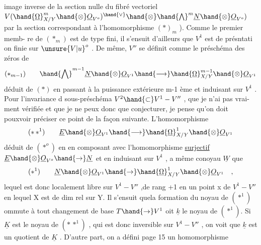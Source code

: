 
image inverse de la section nulle du fibré vectoriel $V(\hand{\underline{\Omega}}^m_{X/Y}\hand{\otimes}\underline{O}_{V^o})^{\hand{\vee}}\hand{\otimes}\hand{\bigwedge}^m\underline{N}\hand{\otimes}\underline{O}_{V^o})$
par la section correspondant à l'homomorphisme $(*)_{m}$ ). Comme le premier memb-%
re de $(*_m)$ est de type fini, il s'ensuit d'ailleurs que $V^1$ est de présntati%
on finie sur $\unsure{V|u}^o$ . De même, $V''$ se définit comme le préschéma des zéros de
\[ (*_{m-1}) \qquad \hand{\bigwedge}^{m-1}\underline{N}\hand{\otimes}\underline{O}_{V^1} \hand{\longrightarrow} \hand{\underline{\Omega}}^{m-1}_{X/Y}\hand{\otimes}\underline{O}_{V^1} \]
déduit de $(*)$ en passant à la puissance extérieure m-1 ème et induisant sur
$V^1$ . Pour l'invariance d sous-préschéma $V^2\hand{\subset} V^1-V''$ , que je n'ai pas vrai-%
ment vérifiée et que je ne peux donc que conjecturer, je pense qu'on doit
pouxvoir préciser ce point de la façon suivante. L'homomorphisme
\[ (*\,*^1) \qquad \underline{E}\hand{\otimes}\underline{O}_{V^1}\hand{\longrightarrow}\hand{\underline{\Omega}}^1_{X/Y}\hand{\otimes}\underline{O}_{V^1} \]
déduit de $(*^o)$ en  en composant avec l'homomorphisme
\uline{surjectif} $\underline{E}\hand{\otimes}\underline{O}_{V^o}\hand{\to}\underline{N}$ et en  induisant sur $V^1$ , a même conoyau
$\underline{W}$ que
\[ (*^1) \qquad \underline{N}\hand{\otimes}\underline{O}_{V^1}\hand{\to}\hand{\underline{\Omega}}^1_{X/Y}\hand{\otimes}\underline{O}_{V^1} \quad , \]
lequel  est donc localement libre sur $V^1-V''$ ,\hand{(}de rang +1 en un point
x de $V^1-V''$ en lequel X est de dim rel  sur Y\hand{)}. Il s'ensuit quela formation
du noyau de $(*^1)$ ommute à tout changement de base $T\hand{\to} V^1$ oit $\underline{k}$ le
noyau de $(*^1)$. Si $\underline{K}$ est le noyau de $(*\,*^1)$ , qui est donc inversible sur
$V^1-V''$ , on voit  que $\underline{k}$ est un quotient de $\underline{K}$ . D'autre part, on a défini
page 15 un homomorphisme
